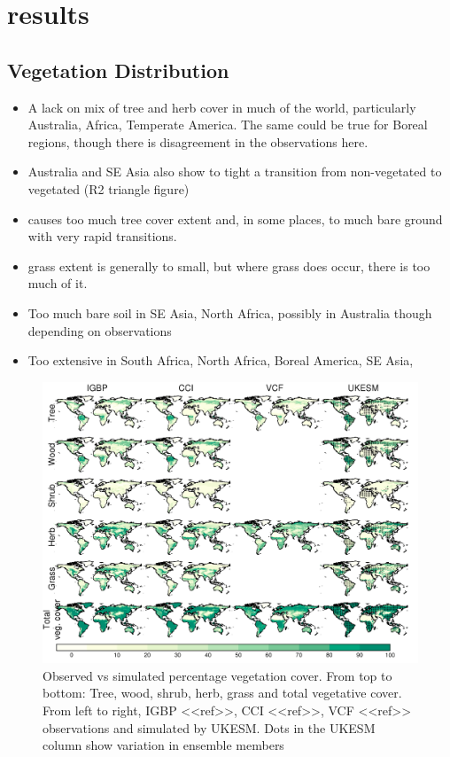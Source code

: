 \documentclass[bg, manuscript]{copernicus}
\begin{document}
\section{results}

\subsection{Vegetation Distribution}
\begin{itemize}
    \item A lack on mix of tree and herb cover in much of the world, particularly Australia, Africa, Temperate America. The same could be true for Boreal regions, though there is disagreement in the observations here.
    \item Australia and SE Asia also show to tight a transition from non-vegetated to vegetated (R2 triangle figure)
    \item causes too much tree cover extent and, in some places, to much bare ground with very rapid transitions.
    \item grass extent is generally to small, but where grass does occur, there is too much of it.
    \item Too much bare soil in SE Asia, North Africa, possibly in Australia though depending on observations
    \item Too extensive in South Africa, North Africa, Boreal America, SE Asia, 
\end{itemize}


\begin{figure}[t]
\includegraphics[width=12cm]{figs/vegDist.png}
\caption{Observed vs simulated percentage vegetation cover. From top to bottom: Tree, wood, shrub, herb, grass and total vegetative cover. From left to right, IGBP <<ref>>, CCI <<ref>>, VCF <<ref>> observations and simulated by UKESM. Dots in the UKESM column show variation in ensemble members}
\end{figure}
\end{document}
